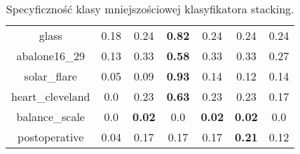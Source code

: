 \begin{table}[H]
\begin{center}
{\begin{tabular}{c|cccccc}
				glass&0.18&0.24&\textbf{0.82}&0.24&0.24&0.24\\%
				abalone16\_29&0.13&0.33&\textbf{0.58}&0.33&0.33&0.27\\%
				solar\_flare&0.05&0.09&\textbf{0.93}&0.14&0.12&0.14\\%
				heart\_cleveland&0.0&0.23&\textbf{0.63}&0.23&0.23&0.17\\%
				balance\_scale&0.0&\textbf{0.02}&0.0&\textbf{0.02}&\textbf{0.02}&0.0\\%
				postoperative&0.04&0.17&0.17&0.17&\textbf{0.21}&0.12\\%
				\end{tabular}}
				\caption{Specyficzność klasy mniejszościowej klasyfikatora stacking.}
				\label{stackingspec}
			\end{center}
		\end{table}

